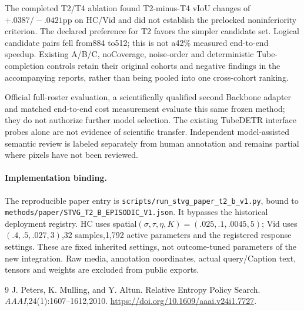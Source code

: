 \documentclass[11pt]{article}
\begin{document}
The completed T2/T4 ablation found T2-minus-T4 vIoU changes of$+.0387/-.0421$pp on HC/Vid and did not establish the prelocked noninferiority criterion. The declared preference for T2 favors the simpler candidate set. Logical candidate pairs fell from884 to512; this is not a42\% measured end-to-end speedup. Existing A/B/C, noCoverage, noise-order and deterministic Tube-completion controls retain their original cohorts and negative findings in the accompanying reports, rather than being pooled into one cross-cohort ranking.

Official full-roster evaluation, a scientifically qualified second Backbone adapter and matched end-to-end cost measurement evaluate this same frozen method; they do not authorize further model selection. The existing TubeDETR interface probes alone are not evidence of scientific transfer. Independent model-assisted semantic review is labeled separately from human annotation and remains partial where pixels have not been reviewed.

\paragraph{Implementation binding.}
The reproducible paper entry is \texttt{scripts/run\_stvg\_paper\_t2\_b\_v1.py}, bound to \texttt{methods/paper/STVG\_T2\_B\_EPISODIC\_V1.json}. It bypasses the historical deployment registry. HC uses spatial$(\sigma,\tau,\eta,K)=(.025,.1,.0045,5)$; Vid uses$(.4,.5,.027,3)$,32 samples,1,792 active parameters and the registered response settings. These are fixed inherited settings, not outcome-tuned parameters of the new integration. Raw media, annotation coordinates, actual query/Caption text, tensors and weights are excluded from public exports.

\begin{thebibliography}{9}
 J. Peters, K. Mulling, and Y. Altun. Relative Entropy Policy Search. \emph{AAAI},24(1):1607--1612,2010. \url{https://doi.org/10.1609/aaai.v24i1.7727}.
\end{thebibliography}
\end{document}
